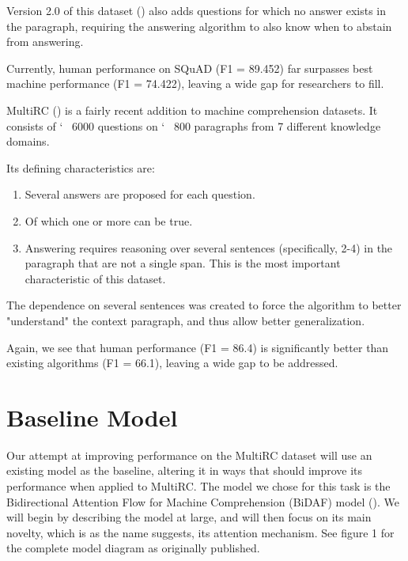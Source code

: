 \documentclass[12pt, a4paper]{article}
\begin{document}
\begin{multicols}{2}
			Version 2.0 of this dataset (\cite{Rajpurkar2018}) also adds questions for which no answer exists in the paragraph, requiring the answering algorithm to also know when to abstain from answering.
			
			Currently, human performance on SQuAD (F1 = 89.452) far surpasses best machine performance (F1 = 74.422), leaving a wide gap for researchers to fill.
			
			MultiRC (\cite{N18-1023}) is a fairly recent addition to machine comprehension datasets. It consists of \char`~ 6000 questions on \char`~ 800 paragraphs from 7 different knowledge domains.
			
			Its defining characteristics are:
			\begin{enumerate}
				\item Several answers are proposed for each question.
				\item Of which one or more can be true.
				\item Answering requires reasoning over several sentences (specifically, 2-4) in the paragraph that are not a single span. This is the most important characteristic of this dataset.
			\end{enumerate}
		
			The dependence on several sentences was created to force the algorithm to better "understand" the context paragraph, and thus allow better generalization.
			
			Again, we see that human performance (F1 = 86.4) is significantly better than existing algorithms (F1 = 66.1), leaving a wide gap to be addressed.
			
		\section{Baseline Model}
		
			Our attempt at improving performance on the MultiRC dataset will use an existing model as the baseline, altering it in ways that should improve its performance when applied to MultiRC. The model we chose for this task is the Bidirectional Attention Flow for Machine Comprehension (BiDAF) model (\cite{Seo2016}). We will begin by describing the model at large, and will then focus on its main novelty, which is as the name suggests, its attention mechanism. See figure 1 for the complete model diagram as originally published.
			

\end{multicols}
\end{document}
